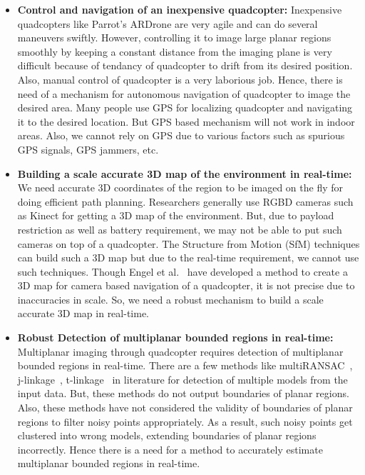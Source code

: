 \begin{itemize}
  \item \textbf{Control and navigation of an inexpensive quadcopter:}
  Inexpensive quadcopters like Parrot's ARDrone are very agile and can do
  several maneuvers swiftly. However, controlling it to image large planar
  regions smoothly by keeping a constant distance from the imaging plane is very
  difficult because of tendancy of quadcopter to drift from its desired
  position. Also, manual control of quadcopter is a very laborious job.
  Hence, there is need of a mechanism for autonomous navigation of quadcopter to image
  the desired area. Many people use GPS for localizing quadcopter and navigating
  it to the desired location. But GPS based mechanism will not work in indoor areas. 
  Also, we cannot rely on GPS due to various factors such as spurious GPS
  signals, GPS jammers, etc.
  
  \item \textbf{Building a scale accurate 3D map of the environment in
  real-time:} We need accurate 3D coordinates of the region to be imaged on the fly for
  doing efficient path planning. Researchers generally use RGBD cameras such as
  Kinect for getting a 3D map of the environment. But, due to payload
  restriction as well as battery requirement, we may not be able to put such
  cameras on top of a quadcopter. The Structure from Motion (SfM) techniques can
  build such a 3D map but due to the real-time requirement, we cannot use such
  techniques. Though Engel et al.~\cite{engel} have developed a method to
  create a 3D map for camera based navigation of a quadcopter, it is not precise
  due to inaccuracies in scale. So, we need a
  robust mechanism to build a scale accurate 3D map in real-time.
  
  \item \textbf{Robust Detection of multiplanar bounded regions in real-time:} 
  Multiplanar imaging through quadcopter requires detection of multiplanar
  bounded regions in real-time. There are a few methods like
  multiRANSAC~\cite{zuliani}, j-linkage~\cite{jlinkage},
  t-linkage~\cite{tlinkage} in literature for detection of multiple models from
  the input data.  But, these methods do not output boundaries of planar
  regions. Also, these methods have not considered the validity of boundaries of
  planar regions to  filter noisy points appropriately. As a result, such noisy
  points get clustered into wrong models, extending boundaries of planar
  regions incorrectly. Hence there is a need for a method to accurately estimate
  multiplanar bounded regions in real-time.
  

\end{itemize}
